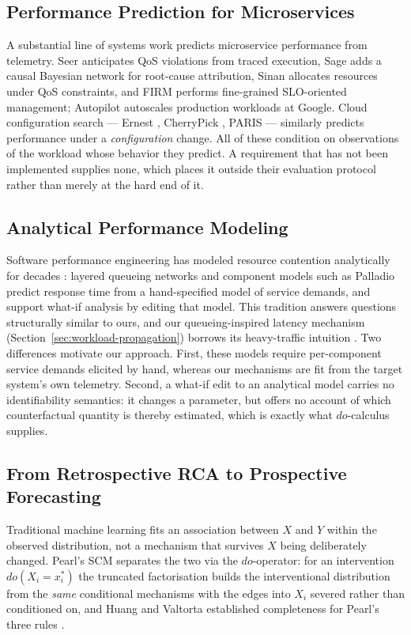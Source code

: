 \documentclass[journal, 10pt]{IEEEtran}
\begin{document}
\subsection{Performance Prediction for Microservices}
A substantial line of systems work predicts microservice performance from
telemetry. Seer \cite{gan2019seer} anticipates QoS violations from traced
execution, Sage \cite{gan2021sage} adds a causal Bayesian network for
root-cause attribution, Sinan \cite{zhang2021sinan} allocates resources under
QoS constraints, and FIRM \cite{qiu2020firm} performs fine-grained SLO-oriented
management; Autopilot \cite{rzadca2020autopilot} autoscales production workloads
at Google. Cloud configuration search --- Ernest \cite{venkataraman2016ernest},
CherryPick \cite{alipourfard2017cherrypick}, PARIS \cite{yadwadkar2017paris} --- similarly predicts performance under a \emph{configuration} change. All of these
condition on observations of the workload whose behavior they predict. A
requirement that has not been implemented supplies none, which places it outside
their evaluation protocol rather than merely at the hard end of it.

\subsection{Analytical Performance Modeling}
Software performance engineering has modeled resource contention analytically
for decades \cite{balsamo2004survey,woodside2007future}: layered queueing
networks \cite{franks2009lqn} and component models such as Palladio
\cite{becker2009palladio} predict response time from a hand-specified model of
service demands, and support what-if analysis by editing that model. This
tradition answers questions structurally similar to ours, and our
queueing-inspired latency mechanism (Section~\ref{sec:workload-propagation})
borrows its heavy-traffic intuition \cite{kingman1961}. Two differences
motivate our approach. First, these models require per-component service demands
elicited by hand, whereas our mechanisms are fit from the target system's own
telemetry. Second, a what-if edit to an analytical model carries no
identifiability semantics: it changes a parameter, but offers no account of
which counterfactual quantity is thereby estimated, which is exactly what
$do$-calculus supplies.

\subsection{From Retrospective RCA to Prospective Forecasting}
Traditional machine learning fits an association between $X$ and $Y$ within the
observed distribution, not a mechanism that survives $X$ being deliberately
changed. Pearl's SCM \cite{pearl2009causality} separates the two via the
$do$-operator: for an intervention $do(X_i = x_i^*)$ the truncated factorisation
builds the interventional distribution from the \emph{same} conditional
mechanisms with the edges into $X_i$ severed rather than conditioned on, and
Huang and Valtorta established completeness for Pearl's three rules
\cite{huang2006complete}.
\end{document}
